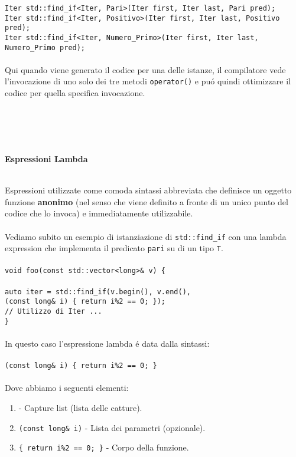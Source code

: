 \documentclass{article}
\newcommand\tab[1][1cm]{\hspace*{#1}}
\begin{document}
\texttt{Iter std::find\_if<Iter, Pari>(Iter first, Iter last, Pari pred);\\Iter std::find\_if<Iter, Positivo>(Iter first, Iter last, Positivo pred);\\Iter std::find\_if<Iter, Numero\_Primo>(Iter first, Iter last, Numero\_Primo pred);} \\ \\ Qui quando viene generato il codice per una delle istanze, il compilatore vede l'invocazione di uno solo dei tre metodi \texttt{operator()} e pu\'o quindi ottimizzare il codice per quella specifica invocazione.
\\ \\ \\ \\ \\
\begin{large}\textbf{\textcolor{blu}{Espressioni Lambda}} \\ \\ \end{large}
Espressioni utilizzate come comoda sintassi abbreviata che definisce un oggetto funzione \textbf{anonimo} (nel senso che viene definito a fronte di un unico punto del codice che lo invoca) e immediatamente utilizzabile.\\ \\Vediamo subito un esempio di istanziazione di \texttt{std::find\_if} con una lambda expression che implementa il predicato \texttt{pari} su di un tipo \texttt{T}.\\ \\
\texttt{void foo(const std::vector<long>\& v) \{ \\ \\ \tab auto iter = std::find\_if(v.begin(), v.end(),\\ \tab \detokenize{[]}(const long\& i) \{ return i\%2 == 0; \}); \\ \tab \textcolor{grigio}{// Utilizzo di Iter ...\\ }\}}\\ \\In questo caso l'espressione lambda \'e data dalla sintassi: \\ \\ \texttt{\detokenize{[]}(const long\& i) \{ return i\%2 == 0; \}} \\ \\ Dove abbiamo i seguenti elementi: \\
\begin{enumerate}
\item \texttt{\detokenize{[]}} - Capture list (lista delle catture).\\
\item \texttt{(const long\& i)} - Lista dei parametri (opzionale).\\
\item \texttt{\{ return i\%2 == 0; \}} - Corpo della funzione.\\
\end{enumerate}
\end{document}
